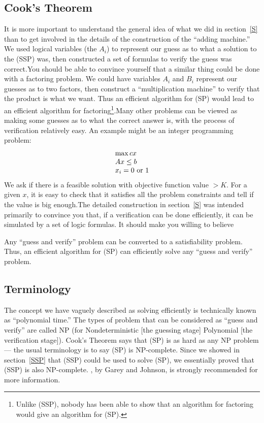 \subsection{Cook's Theorem}It is more important to understand the
general idea of what we did in section~\ref{S} than to get involved in
the details of the construction of the ``adding machine.'' We used 
logical variables (the $A_i$) to represent our guess as to what a solution
to the (SSP) was, then constructed a set of formulas to verify the
guess was correct.\pq You should be able to convince yourself that a
similar thing could be done with a factoring problem.  We could have
variables $A_i$ and $B_i$ represent our guesses as to two factors, then
construct a ``multiplication machine'' to verify that the product is
what we want.  Thus an efficient algorithm for (SP) would lead to an
efficient algorithm for factoring\footnote{Unlike (SSP), nobody has
been able to show that an algorithm for factoring would give an algorithm
for (SP).}.\pq Many other problems can be viewed as making some guesses
as to what the correct answer is, with the process of verification
relatively easy. An example might be an integer programming problem:
$$\begin{array}{l}\max cx\\Ax\le b\\x_i=0\hbox{ or }1\end{array}$$
We ask if there is a feasible solution with objective function value $>K$.
For a given $x$, it is easy to check that it satisfies all the problem
constraints and tell if the value is big enough.\pq The detailed 
construction in section~\ref{S} was intended primarily to convince
you that, if a verification can be done efficiently, it can be 
simulated by a set of logic formulas.  It should make you willing to
believe\begin{Th}[Cook]Any ``guess and verify'' problem can be converted
to a satisfiability problem. Thus, an efficient algorithm for (SP) can
efficiently solve any ``guess and verify'' problem.\end{Th}
\subsection{Terminology} The concept we have vaguely described as
solving efficiently is technically known as ``polynomial time.''
The types of problem that can be considered as ``guess and verify''
are called NP (for Nondeterministic [the guessing stage] Polynomial
[the verification stage]).  Cook's Theorem says that (SP) is as hard
as any NP problem--- the usual terminology is to say (SP) is NP-complete.
Since we showed in section~\ref{SSP} that (SSP) could be used to solve
(SP), we essentially proved that (SSP) is also NP-complete.
, by Garey and Johnson, is strongly
recommended for more information.
